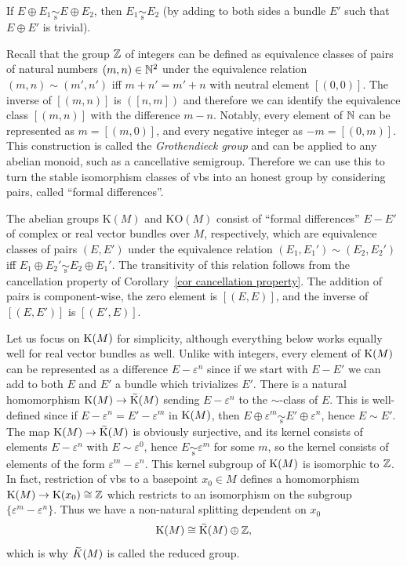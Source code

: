 \begin{cor}\label{cor cancellation property}
    If $E\oplus E_1\underset{\mathrm{s}}{\sim} E\oplus E_2$, then $E_1\underset{\mathrm{s}}{\sim}E_2$ (by adding to both sides a bundle $E'$ such that $E\oplus E'$ is trivial).
\end{cor}

Recall that the group $\mathbb{Z}$ of integers can be defined as equivalence classes of pairs of natural numbers $(m,n)\in \mathbb{N}^2$ under the equivalence relation $(m,n)\sim (m',n')$ iff $m+n'=m'+n$ with neutral element $[(0,0)]$. The inverse of $[(m,n)]$ is $([n,m])$ and therefore we can identify the equivalence class $[(m,n)]$ with the difference $m-n$. Notably, every element of $\mathbb{N}$ can be represented as $m=[(m,0)]$, and every negative integer as $-m=[(0,m)]$. This construction is called the \emph{Grothendieck group} and can be applied to any abelian monoid, such as a cancellative semigroup. Therefore we can use this to turn the stable isomorphism classes of \glspl{vb} into an honest group by considering pairs, called ``formal differences''.

\begin{defn}[K-groups]
    The abelian groups $\mathrm{K}(M)$ and $\mathrm{KO}(M)$ consist of ``formal differences'' $E-E'$ of complex or real vector bundles over $M$, respectively, which are equivalence classes of pairs $(E,E')$ under the equivalence relation $(E_1,E_1')\sim (E_2,E_2')$ iff $E_1\oplus E_2'\underset{\mathrm{s}}{\sim} E_2\oplus E_1'$. The transitivity of this relation follows from the cancellation property of Corollary~\ref{cor cancellation property}. The addition of pairs is component-wise, the zero element is $[(E,E)]$, and the inverse of $[(E,E')]$ is $[(E',E)]$.
\end{defn}

Let us focus on $\mathrm{K}(M)$ for simplicity, although everything below works equally well for real vector bundles as well. Unlike with integers, every element of $\mathrm{K}(M)$ can be represented as a difference $E-\varepsilon^n$ since if we start with $E-E'$ we can add to both $E$ and $E'$ a bundle which trivializes $E'$. There is a natural homomorphism $\rmK(M)\to \wt{\rmK}(M)$ sending $E-\varepsilon^n$ to the $\sim$-class of $E$. This is well-defined since if $E-\varepsilon^n=E'-\varepsilon^m$ in $\mathrm{K}(M)$, then $E\oplus \varepsilon^m\underset{\mathrm{s}}{\sim} E'\oplus \varepsilon^n$, hence $E\sim E'$. The map $\rmK(M)\to\wt{\rmK}(M)$ is obviously surjective, and its kernel consists of elements $E-\varepsilon^n$ with $E\sim \varepsilon^0$, hence $E\underset{\mathrm{s}}{\sim}\varepsilon^m$ for some $m$, so the kernel consists of elements of the form $\varepsilon^m-\varepsilon^n$. This kernel subgroup of $\mathrm{K}(M)$ is isomorphic to $\mathbb{Z}$. In fact, restriction of \glspl{vb} to a basepoint $x_0\in M$ defines a homomorphism $\mathrm{K}(M)\to \mathrm{K}(x_0)\cong \mathbb{Z}$ which restricts to an isomorphism on the subgroup $\{\varepsilon^m-\varepsilon^n\}$. Thus we have a non-natural splitting dependent on $x_0$
\[\rmK(M)\cong \wt{\rmK}(M)\oplus \bbZ,\]
which is why $\wt{K}(M)$ is called the reduced group.

